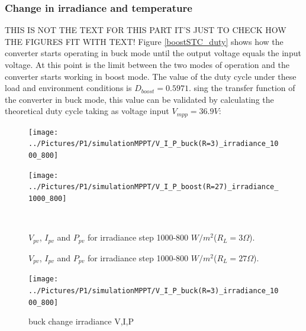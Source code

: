 \subsubsection*{Change in irradiance and temperature}

THIS IS NOT THE TEXT FOR THIS PART IT'S JUST TO CHECK HOW THE FIGURES FIT WITH TEXT!
Figure \ref{boostSTC_duty} shows how the converter starts operating in buck mode until the output voltage equals the input voltage. At this point is the limit between the two modes of operation and the converter starts working in boost mode. The value of the duty cycle under these load and environment conditions is $D_{boost}= 0.5971$. sing the transfer function of the converter in  buck mode, this value can be validated by calculating the theoretical duty cycle taking as voltage input $V_{mpp}=36.9 V$: 

\begin{figure}[H]
	\begin{minipage}[c]{0.6\textwidth}
		\centering
		\texttt{[image: ../Pictures/P1/simulationMPPT/V\_I\_P\_buck(R=3)\_irradiance\_1000\_800]} %
	\end{minipage}%
	\hfill
	\begin{minipage}[c]{0.6\textwidth}
		\centering
		\texttt{[image: ../Pictures/P1/simulationMPPT/V\_I\_P\_boost(R=27)\_irradiance\_1000\_800]} %
	\end{minipage} \\ %
	\begin{minipage}[t]{0.6\textwidth}
		\caption{$V_{pv}$, $I_{pv}$ and $P_{pv}$ for irradiance step 1000-800 $W/ m^2$($R_{L}=3\Omega$).} %
		\label{buckirradiance}
	\end{minipage}%
	\hfill
	\begin{minipage}[t]{0.6\textwidth}
		\caption{$V_{pv}$, $I_{pv}$ and $P_{pv}$ for irradiance step 1000-800 $W/ m^2$($R_{L}=27\Omega$).} %
		\label{boostirradiance}
	\end{minipage}
\end{figure}

\iffalse
\begin{figure}[H]
	\begin{center}
		\texttt{[image: ../Pictures/P1/simulationMPPT/V\_I\_P\_buck(R=3)\_irradiance\_1000\_800]}
		\caption{buck change irradiance V,I,P}
		\label{buckirradiance} 
	\end{center}	
\end{figure}


